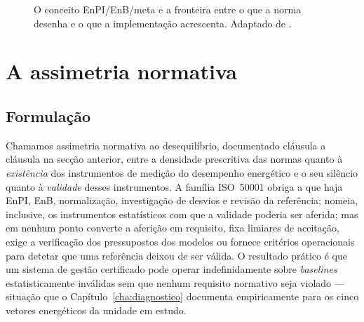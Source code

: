 \begin{figure}[htbp]
  \centering
  \caption[O conceito EnPI/EnB/meta e a extensão de implementação]{O conceito EnPI/EnB/meta e a fronteira entre o que a norma desenha e o que a implementação acrescenta. Adaptado de \cite[Figura~1]{ISO50006_2014}.}
  \label{fig:enpi-enb-meta}
\end{figure}

\section{A assimetria normativa}
\label{sec:assimetria}

\subsection{Formulação}
\label{sec:assimetria-formulacao}

Chamamos assimetria normativa ao desequilíbrio, documentado cláusula a cláusula na secção anterior, entre a densidade prescritiva das normas quanto à \emph{existência} dos instrumentos de medição do desempenho energético e o seu silêncio quanto à \emph{validade} desses instrumentos. A família ISO~50001 obriga a que haja EnPI, EnB, normalização, investigação de desvios e revisão da referência; nomeia, inclusive, os instrumentos estatísticos com que a validade poderia ser aferida; mas em nenhum ponto converte a aferição em requisito, fixa limiares de aceitação, exige a verificação dos pressupostos dos modelos ou fornece critérios operacionais para detetar que uma referência deixou de ser válida. O resultado prático é que um sistema de gestão certificado pode operar indefinidamente sobre \emph{baselines} estatisticamente inválidas sem que nenhum requisito normativo seja violado --- situação que o Capítulo~\ref{cha:diagnostico} documenta empiricamente para os cinco vetores energéticos da unidade em estudo.

